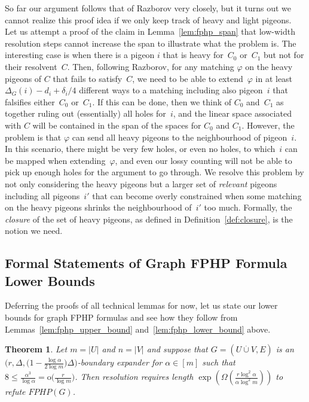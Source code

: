 \documentclass{article}
\newtheorem{theorem}{Theorem}\newtheorem{lemma}[theorem]{Lemma}\newtheorem{proposition}[theorem]{Proposition}\newtheorem{corollary}[theorem]{Corollary}\newtheorem{definition}[theorem]{Definition}\newtheorem{claim}[theorem]{Claim}\newtheorem{remark}[theorem]{Remark}
\newcommand{\Littleoh}[1]{\mathrm{o} \bigl( #1 \bigr)}
\newcommand{\BIGOMEGA}[1]{\Omega \left( #1 \right)}
\newcommand{\setsize}[1]{\lvert#1\rvert}
\newcommand{\disjointunion}{\overset{.}{\cup}}
\newcommand{\introduceterm}[1]{{\emph{#1}}}
\newcommand{\reflem}[1]{Lemma~\ref{#1}}
\newcommand{\reftwolems}[2]{Lemmas~\ref{#1} and~\ref{#2}}
\newcommand{\refdef}[1]{Definition~\ref{#1}}
\newcommand{\formulaformat}[1]{\mathit{#1}}
\newcommand{\graphfphpnot}[1][G]{\formulaformat{FPHP}({#1})}
\newcommand{\heavy}{heavy\xspace}
\newcommand{\light}{light\xspace}
\newcommand{\GFPHP}{G\text{-}FPHP}
\renewcommand{\GFPHP}{\graphfphpnot[G]}
\renewcommand{\deg}[2][XXXXXXXXXXXX]{\Delta_{#1}(#2)}
\newcommand{\dimLi}{\deg[G]{i} - d_i + \delta_i/4}
\newcommand{\GdegMax}{\Delta}
\newcommand{\matcha}{\varphi}
\newcommand{\squeezesubsection}[1]{\subsection{#1}}
\numberwithin{equation}{section}
\begin{document}
So far our argument follows that of Razborov very closely, but
it turns out we cannot realize this proof idea if we only keep track
of \heavy and \light pigeons. Let us attempt a proof of the claim in
\reflem{lem:fphp_span} that low-width resolution steps cannot increase
the span to illustrate what the problem is.
The interesting case is when there is a pigeon $i$ that is \heavy
for~$C_0$ or~$C_1$
but not for their resolvent~$C$. 
Then, following Razborov, for any matching $\matcha$ on the \heavy
pigeons of $C$ that  fails to satisfy~$C$, 
we need to be able to extend~$\matcha$ in at
least $\dimLi$ different ways to a matching including also pigeon~$i$
that falsifies either~$C_0$ or~$C_1$. If this can be done, then we think
of $C_0$ and~$C_1$ as together ruling out (essentially) all holes
for~$i$, and  the linear space associated with $C$ will be contained
in the span of the spaces for $C_0$ and $C_1$.
However, the problem is that $\matcha$ can send all \heavy pigeons to
the neighbourhood of pigeon~$i$. In this scenario, there might be very
few holes, or even no holes, to which~$i$ can be mapped when
extending~$\matcha$, and even our lossy counting will not be able to
pick up enough holes for the argument to go through.
We resolve this problem by not only considering the \heavy pigeons but
a larger set of \introduceterm{relevant} pigeons including all pigeons~$i'$
that can become overly constrained when some matching on the \heavy pigeons
shrinks the neighbourhood of~$i'$ too much.
Formally, the \introduceterm{closure} of the set of \heavy pigeons,
as defined in \refdef{def:closure},
is the notion we need.


 
\squeezesubsection{Formal Statements of Graph FPHP Formula Lower Bounds}
\label{sec:fphp_results}


Deferring the proofs of all technical lemmas for now, 
let us state our lower bounds for graph FPHP formulas and see how they
follow from  
\reftwolems{lem:fphp_upper_bound}{lem:fphp_lower_bound}
above.


\begin{theorem} \label{thm:main}
  Let
  $m = \setsize{ U }$ and $n = \setsize{ V }$ and suppose that
  $
  G = (U 
  \disjointunion
  V, E)
  $
  is an
  $\bigl( 
  r, 
  \GdegMax, 
  \bigl(1 - \frac{ \log \alpha}{ 2 \log m} \bigr)\GdegMax \bigr)
  $-boundary 
  expander
  for $\alpha \in [m]$ such that 
  $8 \le \frac{ \alpha^3 }{ \log \alpha} = \Littleoh{\frac{ r }{ \log m }}$.
  Then resolution requires length
  $\exp \left( \BIGOMEGA {\frac{ r \log^2\alpha }{ \alpha \log^2 m }} \right)$
  to refute $\GFPHP$.
\end{theorem}
\end{document}
